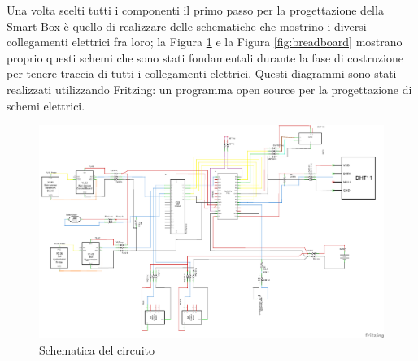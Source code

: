 \documentclass[fleqn, 12pt]{SelfArx}
\begin{document}
Una volta scelti tutti i componenti il primo passo per la progettazione della Smart Box è quello di realizzare delle schematiche che mostrino i diversi collegamenti elettrici fra loro; la Figura \ref{fig:schematics} 
e la Figura \ref{fig:breadboard} mostrano proprio questi schemi che sono stati fondamentali durante la fase di costruzione per tenere traccia di tutti i collegamenti elettrici. Questi diagrammi sono stati realizzati 
utilizzando Fritzing\cite{fritzing}: un programma open source per la progettazione di schemi elettrici.

\begin{figure}[htb]
\centering
\includegraphics[scale=0.25]{hardware/iot_project_schem.png}
\caption{Schematica del circuito}
\label{fig:schematics}
\end{figure}
\end{document}
